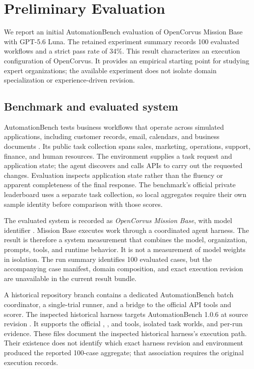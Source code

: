 \section{Preliminary Evaluation}\label{sec:evaluation}
We report an initial AutomationBench evaluation of OpenCorvus Mission Base with GPT-5.6 Luna. The retained experiment summary records 100 evaluated workflows and a strict pass rate of 34\%. This result characterizes an execution configuration of OpenCorvus. It provides an empirical starting point for studying expert organizations; the available experiment does not isolate domain specialization or experience-driven revision.

\subsection{Benchmark and evaluated system}
AutomationBench tests business workflows that operate across simulated applications, including customer records, email, calendars, and business documents \citep{automationbench}. Its public task collection spans sales, marketing, operations, support, finance, and human resources. The environment supplies a task request and application state; the agent discovers and calls APIs to carry out the requested changes. Evaluation inspects application state rather than the fluency or apparent completeness of the final response. The benchmark's official private leaderboard uses a separate task collection, so local aggregates require their own sample identity before comparison with those scores.

The evaluated system is recorded as \emph{OpenCorvus Mission Base}, with model identifier . Mission Base executes work through a coordinated agent harness. The result is therefore a system measurement that combines the model, organization, prompts, tools, and runtime behavior. It is not a measurement of model weights in isolation. The run summary identifies 100 evaluated cases, but the accompanying case manifest, domain composition, and exact execution revision are unavailable in the current result bundle.

A historical repository branch contains a dedicated AutomationBench batch coordinator, a single-trial runner, and a bridge to the official API tools and scorer. The inspected historical harness targets AutomationBench 1.0.6 at source revision  \citep{automationbenchcode}. It supports the official , , and  tools, isolated task worlds, and per-run evidence. These files document the inspected historical harness's execution path. Their existence does not identify which exact harness revision and environment produced the reported 100-case aggregate; that association requires the original execution records.


